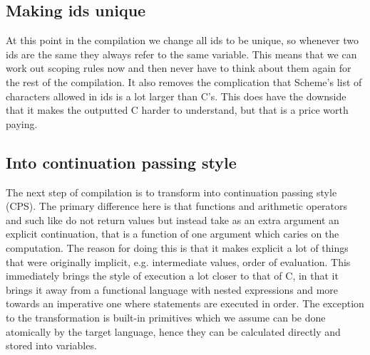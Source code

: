 \documentclass[a4paper]{article}
\begin{document}

\subsection{Making ids unique}

At this point in the compilation we change all ids to be unique, so whenever two ids are the same they always refer to the same variable. This means that we can work out scoping rules now and then never have to think about them again for the rest of the compilation. It also removes the complication that Scheme's list of characters allowed in ids is a lot larger than C's. This does have the downside that it makes the outputted C harder to understand, but that is a price worth paying.




\subsection{Into continuation passing style}

The next step of compilation is to transform into continuation passing style (CPS). The primary difference here is that functions and arithmetic operators and such like do not return values but instead take as an extra argument an explicit continuation, that is a function of one argument which caries on the computation. The reason for doing this is that it makes explicit a lot of things that were originally implicit, e.g. intermediate values, order of evaluation. This immediately brings the style of execution a lot closer to that of C, in that it brings it away from a functional language with nested expressions and more towards an imperative one where statements are executed in order. The exception to the transformation is built-in primitives which we assume can be done atomically by the target language, hence they can be calculated directly and stored into variables.
\end{document}

